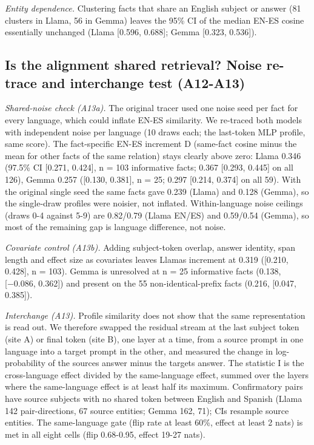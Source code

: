 \documentclass[11pt]{article}
\begin{document}
\emph{Entity dependence.} Clustering facts that share an English subject or answer (81 clusters in Llama, 56 in Gemma) leaves the 95\% CI of the median EN-ES cosine essentially unchanged (Llama {[}0.596, 0.688{]}; Gemma {[}0.323, 0.536{]}).

\subsection{Is the alignment shared retrieval? Noise re-trace and interchange test (A12-A13)}
\emph{Shared-noise check (A13a).} The original tracer used one noise seed per fact for every language, which could inflate EN-ES similarity. We re-traced both models with independent noise per language (10 draws each; the last-token MLP profile, same score). The fact-specific EN-ES increment D (same-fact cosine minus the mean for other facts of the same relation) stays clearly above zero: Llama 0.346 (97.5\% CI {[}0.271, 0.424{]}, n = 103 informative facts; 0.367 {[}0.293, 0.445{]} on all 126), Gemma 0.257 ({[}0.130, 0.381{]}, n = 25; 0.297 {[}0.214, 0.374{]} on all 59). With the original single seed the same facts gave 0.239 (Llama) and 0.128 (Gemma), so the single-draw profiles were noisier, not inflated. Within-language noise ceilings (draws 0-4 against 5-9) are 0.82/0.79 (Llama EN/ES) and 0.59/0.54 (Gemma), so most of the remaining gap is language difference, not noise.

\emph{Covariate control (A13b).} Adding subject-token overlap, answer identity, span length and effect size as covariates leaves Llama\textquotesingle s increment at 0.319 ({[}0.210, 0.428{]}, n = 103). Gemma is unresolved at n = 25 informative facts (0.138, {[}−0.086, 0.362{]}) and present on the 55 non-identical-prefix facts (0.216, {[}0.047, 0.385{]}).

\emph{Interchange (A13).} Profile similarity does not show that the same representation is read out. We therefore swapped the residual stream at the last subject token (site A) or final token (site B), one layer at a time, from a source prompt in one language into a target prompt in the other, and measured the change in log-probability of the source\textquotesingle s answer minus the target\textquotesingle s answer. The statistic I is the cross-language effect divided by the same-language effect, summed over the layers where the same-language effect is at least half its maximum. Confirmatory pairs have source subjects with no shared token between English and Spanish (Llama 142 pair-directions, 67 source entities; Gemma 162, 71); CIs resample source entities. The same-language gate (flip rate at least 60\%, effect at least 2 nats) is met in all eight cells (flip 0.68-0.95, effect 19-27 nats).
\end{document}
